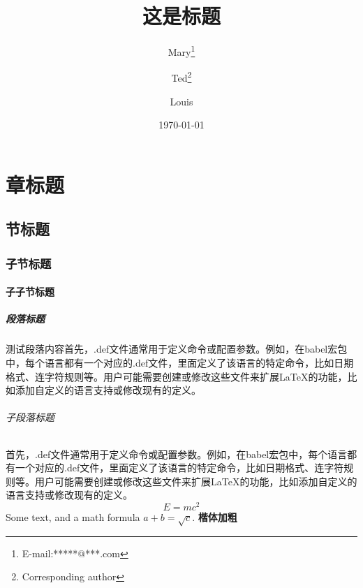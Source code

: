\documentclass[
    12pt, 
    a4paper,
    scheme=chinese, 
    oneside, 
    openany,   %
    fontset=none, 
    sub3section,
    linespread = 1.389
    ]{ctexbook}
\title{这是标题}
\author{ Mary\thanks{E-mail:*****@***.com}
\and Ted\thanks{Corresponding author}
\and Louis}
\date{\today}
\begin{document}
\maketitle

\tableofcontents


\chapter{章标题}
\zhlipsum[1]
\section{节标题}
\zhlipsum[1]
\subsection{子节标题}
\zhlipsum[1]
\subsubsection{子子节标题}

\paragraph{段落标题} 测试段落内容首先，.def文件通常用于定义命令或配置参数。例如，在babel宏包中，每个语言都有一个对应的.def文件，里面定义了该语言的特定命令，比如日期格式、连字符规则等。用户可能需要创建或修改这些文件来扩展LaTeX的功能，比如添加自定义的语言支持或修改现有的定义。
\subparagraph{子段落标题}首先，.def文件通常用于定义命令或配置参数。例如，在babel宏包中，每个语言都有一个对应的.def文件，里面定义了该语言的特定命令，比如日期格式、连字符规则等。用户可能需要创建或修改这些文件来扩展LaTeX的功能，比如添加自定义的语言支持或修改现有的定义。
\begin{equation}
    E = mc^2
\end{equation}
Some text, and a math formula \(a+b=\sqrt{c}\).
\textbf{\textsf 楷体加粗}
\end{document}
